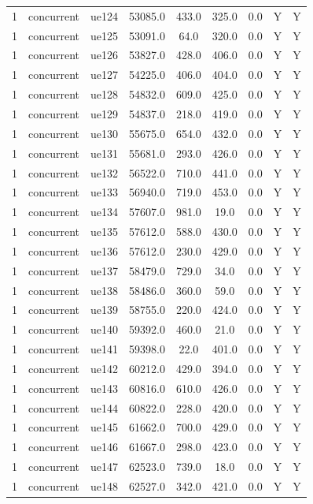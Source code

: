 \begin{table}[ht]
\begin{tabular}{|c|c|c|c|c|c|c|c|c|}
1 & concurrent & ue124 & 53085.0 & 433.0 & 325.0 & 0.0 & Y & Y \\
1 & concurrent & ue125 & 53091.0 & 64.0 & 320.0 & 0.0 & Y & Y \\
1 & concurrent & ue126 & 53827.0 & 428.0 & 406.0 & 0.0 & Y & Y \\
1 & concurrent & ue127 & 54225.0 & 406.0 & 404.0 & 0.0 & Y & Y \\
1 & concurrent & ue128 & 54832.0 & 609.0 & 425.0 & 0.0 & Y & Y \\
1 & concurrent & ue129 & 54837.0 & 218.0 & 419.0 & 0.0 & Y & Y \\
1 & concurrent & ue130 & 55675.0 & 654.0 & 432.0 & 0.0 & Y & Y \\
1 & concurrent & ue131 & 55681.0 & 293.0 & 426.0 & 0.0 & Y & Y \\
1 & concurrent & ue132 & 56522.0 & 710.0 & 441.0 & 0.0 & Y & Y \\
1 & concurrent & ue133 & 56940.0 & 719.0 & 453.0 & 0.0 & Y & Y \\
1 & concurrent & ue134 & 57607.0 & 981.0 & 19.0 & 0.0 & Y & Y \\
1 & concurrent & ue135 & 57612.0 & 588.0 & 430.0 & 0.0 & Y & Y \\
1 & concurrent & ue136 & 57612.0 & 230.0 & 429.0 & 0.0 & Y & Y \\
1 & concurrent & ue137 & 58479.0 & 729.0 & 34.0 & 0.0 & Y & Y \\
1 & concurrent & ue138 & 58486.0 & 360.0 & 59.0 & 0.0 & Y & Y \\
1 & concurrent & ue139 & 58755.0 & 220.0 & 424.0 & 0.0 & Y & Y \\
1 & concurrent & ue140 & 59392.0 & 460.0 & 21.0 & 0.0 & Y & Y \\
1 & concurrent & ue141 & 59398.0 & 22.0 & 401.0 & 0.0 & Y & Y \\
1 & concurrent & ue142 & 60212.0 & 429.0 & 394.0 & 0.0 & Y & Y \\
1 & concurrent & ue143 & 60816.0 & 610.0 & 426.0 & 0.0 & Y & Y \\
1 & concurrent & ue144 & 60822.0 & 228.0 & 420.0 & 0.0 & Y & Y \\
1 & concurrent & ue145 & 61662.0 & 700.0 & 429.0 & 0.0 & Y & Y \\
1 & concurrent & ue146 & 61667.0 & 298.0 & 423.0 & 0.0 & Y & Y \\
1 & concurrent & ue147 & 62523.0 & 739.0 & 18.0 & 0.0 & Y & Y \\
1 & concurrent & ue148 & 62527.0 & 342.0 & 421.0 & 0.0 & Y & Y \\

\end{tabular}
\end{table}
